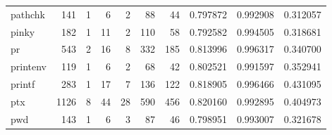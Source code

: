 \begin{tabular}{lrrrrrrrrr}
pathchk   &                    141 &                                  1 &                                 6 &                                2 &                                88 &                              44 &                                0.797872 &                               0.992908 &                             0.312057 \\
pinky     &                    182 &                                  1 &                                11 &                                2 &                               110 &                              58 &                                0.792582 &                               0.994505 &                             0.318681 \\
pr        &                    543 &                                  2 &                                16 &                                8 &                               332 &                             185 &                                0.813996 &                               0.996317 &                             0.340700 \\
printenv  &                    119 &                                  1 &                                 6 &                                2 &                                68 &                              42 &                                0.802521 &                               0.991597 &                             0.352941 \\
printf    &                    283 &                                  1 &                                17 &                                7 &                               136 &                             122 &                                0.818905 &                               0.996466 &                             0.431095 \\
ptx       &                   1126 &                                  8 &                                44 &                               28 &                               590 &                             456 &                                0.820160 &                               0.992895 &                             0.404973 \\
pwd       &                    143 &                                  1 &                                 6 &                                3 &                                87 &                              46 &                                0.798951 &                               0.993007 &                             0.321678 \\

\end{tabular}
